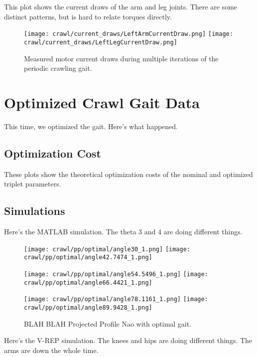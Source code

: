 This plot shows the current draws of the arm and leg joints.
There are some distinct patterns, but is hard to relate torques directly.

\begin{figure}
  \centerline{
    \texttt{[image: crawl/current\_draws/LeftArmCurrentDraw.png]}
    \texttt{[image: crawl/current\_draws/LeftLegCurrentDraw.png]}
  }
  \caption{Measured motor current draws during multiple iterations of the periodic crawling gait.}
  \label{fig:nao_currents}
\end{figure}




\FloatBarrier
\section{Optimized Crawl Gait Data} \label{sec:opt_crawl_data}

This time, we optimized the gait. Here's what happened.

\subsection{Optimization Cost}
These plots show the theoretical optimization costs of the nominal and optimized
triplet parameters. 



\subsection{Simulations}

Here's the MATLAB simulation. The theta 3 and 4 are doing different things.

\begin{figure}
  \centerline{
    \texttt{[image: crawl/pp/optimal/angle30\_1.png]}
    \texttt{[image: crawl/pp/optimal/angle42.7474\_1.png]}
  }
  \centerline{
    \texttt{[image: crawl/pp/optimal/angle54.5496\_1.png]}
    \texttt{[image: crawl/pp/optimal/angle66.4421\_1.png]}
  }
  \centerline{
    \texttt{[image: crawl/pp/optimal/angle78.1161\_1.png]}
    \texttt{[image: crawl/pp/optimal/angle89.9428\_1.png]}
  }
  \caption{BLAH BLAH Projected Profile Nao with optimal gait.}
  \label{fig:pp_opt_gait1}
\end{figure}

Here's the V-REP simulation. The knees and hips are doing different things.
The arms are down the whole time.

